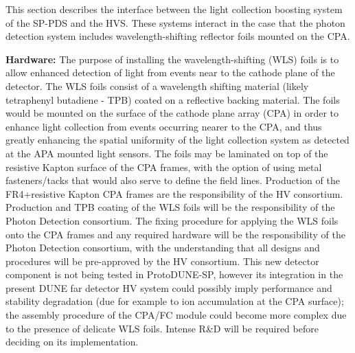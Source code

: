 

This section describes the interface between the light collection boosting system of the SP-PDS  and the HVS. These systems interact in the case that the photon detection system includes wavelength-shifting reflector foils mounted on the CPA.

\textbf{Hardware: }The purpose of installing the wavelength-shifting (WLS) foils is to allow enhanced detection of light from events near to the cathode plane of the detector. The WLS foils consist of a wavelength shifting material (likely tetraphenyl butadiene - TPB) coated on a reflective backing material. The foils would be mounted on the surface of the cathode plane array (CPA) in order to enhance light collection from events occurring nearer to the CPA, and thus greatly enhancing the spatial uniformity of the light collection system as detected at the APA mounted light sensors. The foils may be laminated on top of the resistive Kapton surface of the CPA frames, with the option of using metal fasteners/tacks that would also serve to define the field lines. Production of the FR4+resistive Kapton CPA frames are the responsibility of the HV consortium. Production and TPB coating of the WLS foils will be the responsibility of the Photon Detection consortium. The fixing procedure for applying the WLS foils onto the CPA frames and any required hardware will be the responsibility of the Photon Detection consortium, with the understanding that all designs and procedures will be pre-approved by the HV consortium. This new detector component is not being tested in ProtoDUNE-SP, however its integration in the present DUNE far detector HV system could possibly imply performance and stability degradation (due for example to ion accumulation at the CPA surface); the assembly procedure of the CPA/FC module could become more complex due to the presence of delicate WLS foils. Intense R\&D will be required before deciding on its implementation.

